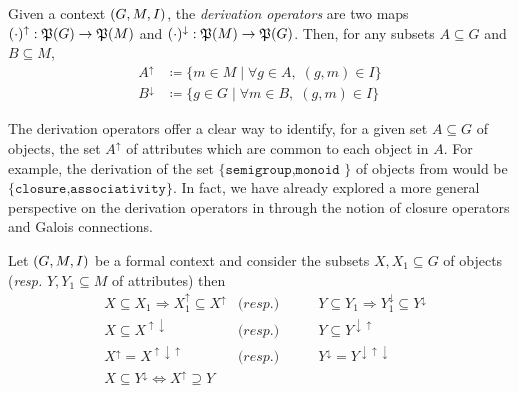 \begin{definition}
  \label{definition:derivation-operators}  Given a context $(G,M,\mathrel{I})$, the \textit{derivation operators} are two maps
  $(\cdot)^{\uparrow}: \mathfrak{P}({G})\to \mathfrak{P}({M})$ and $(\cdot )^{\downarrow}: \mathfrak{P}({M})\to \mathfrak{P}({G})$. Then, for any subsets $A \subseteq G$ and $B
  \subseteq M$,
  \begin{align*}
    A^{\uparrow}   & \coloneqq \{m \in M \mid \forall g \in A, \; (g,m) \in I\} \\
    B^{\downarrow} & \coloneqq \{g \in G \mid \forall m \in B, \; (g,m) \in I\}
  \end{align*}
\end{definition}

The derivation operators offer a clear way to identify, for a given set $A \subseteq G$ of objects, the set $A^{\uparrow}$ of attributes which
are common to each object in $A$. For example, the derivation of the set $\{\texttt{semigroup,monoid }\}$ of objects from 
would be $\{\texttt{closure,associativity}\}$. In fact, we have already explored a more general perspective on the derivation operators in 
through the notion of closure operators and Galois connections.

\begin{proposition}
  \label{proposition:derivation-operators-galois} Let $(G,M,\mathrel{I})$ be a formal context and consider the subsets $X,X_{1}\subseteq G$ of objects (\textit{resp.}
  $Y,Y_{1}\subseteq M$ of attributes) then
  \begin{align}
     & X \subseteq X_{1}\Rightarrow X_{1}^{\uparrow}\subseteq X^{\uparrow}   & \textit{(resp.)}         & \qquad Y \subseteq Y_{1}\Rightarrow Y_{1}^{\downarrow}\subseteq Y^{\downarrow}\label{equation:galois-1} \\
     & X \subseteq X^{\uparrow \downarrow}                                   & \textit{(resp.)}         & \qquad Y \subseteq Y^{\downarrow \uparrow}\label{equation:galois-2}                                     \\
     & X^{\uparrow}= X^{\uparrow \downarrow \uparrow}                        & \textit{(resp.)}         & \qquad Y^{\downarrow}= Y^{\downarrow \uparrow \downarrow}\label{equation:galois-3}                      \\
     & X \subseteq Y^{\downarrow}\Longleftrightarrow X^{\uparrow}\supseteq Y & \label{equation:galois-4}
  \end{align}
\end{proposition}

